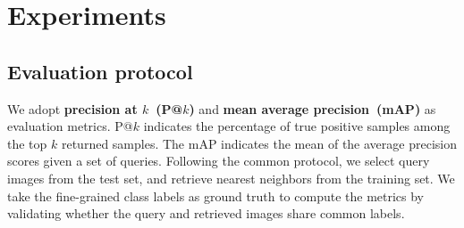 \documentclass[runningheads]{llncs}
\begin{document}
\section{Experiments}\label{sec:exp}\subsection{Evaluation protocol}
We adopt \textbf{precision at $k$~(P@$k$)} and \textbf{mean average precision~(mAP)} as evaluation metrics.
P@$k$ indicates the percentage of true positive samples among the top $k$ returned samples. The mAP indicates the mean of the average precision scores given a set of queries.
Following the common protocol, we select query images from the test set, and retrieve nearest neighbors from the training set. 
We take the fine-grained class labels as ground truth to compute the metrics by validating whether the query and retrieved images share common labels. 
\end{document}
